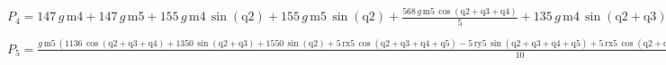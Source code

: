 \documentclass[fleqn, a4paper, 5pt, russian]{article}
\begin{document}
\begin{landscape}
$
P_4=
147\, g\, \mathrm{m4} + 147\, g\, \mathrm{m5} + 155\, g\, \mathrm{m4}\, \sin\!\left(\mathrm{q2}\right) + 155\, g\, \mathrm{m5}\, \sin\!\left(\mathrm{q2}\right) + \frac{568\, g\, \mathrm{m5}\, \cos\!\left(\mathrm{q2} + \mathrm{q3} + \mathrm{q4}\right)}{5} + 135\, g\, \mathrm{m4}\, \sin\!\left(\mathrm{q2} + \mathrm{q3}\right) + 135\, g\, \mathrm{m5}\, \sin\!\left(\mathrm{q2} + \mathrm{q3}\right) + \frac{g\, \mathrm{m5}\, \mathrm{rx5}\, \cos\!\left(\mathrm{q2} + \mathrm{q3} + \mathrm{q4} + \mathrm{q5}\right)}{2} - \frac{g\, \mathrm{m5}\, \mathrm{ry5}\, \sin\!\left(\mathrm{q2} + \mathrm{q3} + \mathrm{q4} + \mathrm{q5}\right)}{2} + \frac{g\, \mathrm{m5}\, \mathrm{rx5}\, \cos\!\left(\mathrm{q2} + \mathrm{q3} + \mathrm{q4} - \mathrm{q5}\right)}{2} + \frac{g\, \mathrm{m5}\, \mathrm{ry5}\, \sin\!\left(\mathrm{q2} + \mathrm{q3} + \mathrm{q4} - \mathrm{q5}\right)}{2} + g\, \mathrm{m4}\, \mathrm{ry4}\, \cos\!\left(\mathrm{q2} + \mathrm{q3} + \mathrm{q4}\right) + g\, \mathrm{m4}\, \mathrm{rx4}\, \sin\!\left(\mathrm{q2} + \mathrm{q3} + \mathrm{q4}\right) - g\, \mathrm{m5}\, \mathrm{rz5}\, \sin\!\left(\mathrm{q2} + \mathrm{q3} + \mathrm{q4}\right)
$

$
P_5=
\frac{g\, \mathrm{m5}\, \left(1136\, \cos\!\left(\mathrm{q2} + \mathrm{q3} + \mathrm{q4}\right) + 1350\, \sin\!\left(\mathrm{q2} + \mathrm{q3}\right) + 1550\, \sin\!\left(\mathrm{q2}\right) + 5\, \mathrm{rx5}\, \cos\!\left(\mathrm{q2} + \mathrm{q3} + \mathrm{q4} + \mathrm{q5}\right) - 5\, \mathrm{ry5}\, \sin\!\left(\mathrm{q2} + \mathrm{q3} + \mathrm{q4} + \mathrm{q5}\right) + 5\, \mathrm{rx5}\, \cos\!\left(\mathrm{q2} + \mathrm{q3} + \mathrm{q4} - \mathrm{q5}\right) + 5\, \mathrm{ry5}\, \sin\!\left(\mathrm{q2} + \mathrm{q3} + \mathrm{q4} - \mathrm{q5}\right) - 10\, \mathrm{rz5}\, \sin\!\left(\mathrm{q2} + \mathrm{q3} + \mathrm{q4}\right) + 1470\right)}{10}
$


\end{landscape}
\end{document}
